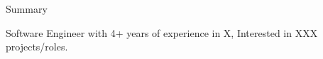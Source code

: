 \begin{rSection}{Summary}

    {Software Engineer with 4+ years of experience in X, Interested in XXX projects/roles.}
    
    
    \end{rSection}